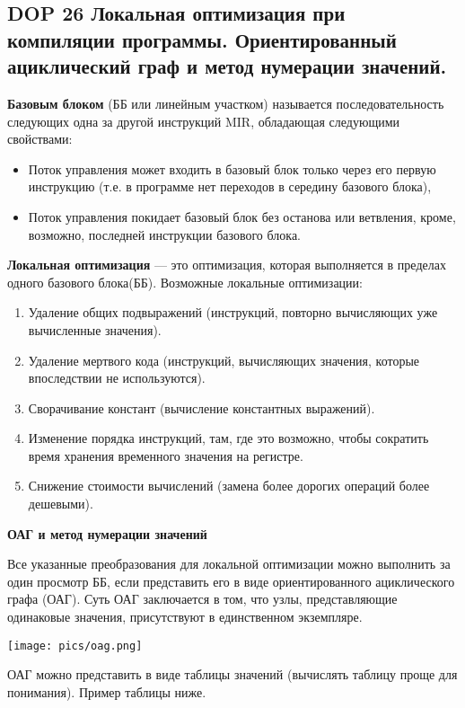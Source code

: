 \subsection{DOP 26 Локальная  оптимизация при  компиляции  программы. Ориентированный  ациклический  граф  и  метод нумерации значений.}

\textbf{Базовым блоком} (ББ или линейным участком) называется последовательность следующих одна за другой инструкций MIR, обладающая следующими свойствами:
\begin{itemize}
    \item Поток управления может входить в базовый блок только через его первую инструкцию (т.е. в программе нет переходов в середину базового блока),
    \item Поток управления покидает базовый блок без останова или ветвления, кроме, возможно, последней инструкции базового блока.
\end{itemize}

\textbf{Локальная оптимизация} --- это оптимизация, которая выполняется в пределах одного базового блока(ББ). Возможные локальные оптимизации:
\begin{enumerate}
    \item Удаление общих подвыражений (инструкций, повторно вычисляющих уже вычисленные значения).
    \item Удаление мертвого кода (инструкций, вычисляющих значения, которые впоследствии не используются).
    \item Сворачивание констант (вычисление константных выражений).
    \item Изменение порядка инструкций, там, где это возможно, чтобы сократить время хранения временного значения на регистре.
    \item Снижение стоимости вычислений (замена более дорогих операций более дешевыми).
\end{enumerate}

\textbf{ОАГ и метод нумерации значений}

Все указанные преобразования для локальной оптимизации можно выполнить за один просмотр ББ, если представить его в виде ориентированного ациклического графа (ОАГ).
Суть ОАГ заключается в том, что узлы, представляющие одинаковые значения, присутствуют в единственном экземпляре.

\texttt{[image: pics/oag.png]}

ОАГ можно представить в виде таблицы значений (вычислять таблицу проще для понимания). Пример таблицы ниже.

